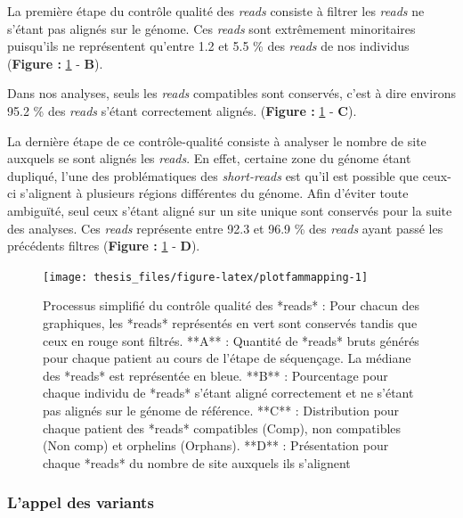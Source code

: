 \documentclass[12pt,twoside]{reedthesis}
\theoremstyle{definition}
\theoremstyle{definition}
\theoremstyle{remark}
\begin{document}
  La première étape du contrôle qualité des \emph{reads} consiste à
  filtrer les \emph{reads} ne s'étant pas alignés sur le génome. Ces
  \emph{reads} sont extrêmement minoritaires puisqu'ils ne représentent
  qu'entre 1.2 et 5.5 \% des \emph{reads} de nos individus (\textbf{Figure
  : }\ref{fig:plotfammapping} - \textbf{B}).
  
  Dans nos analyses, seuls les \emph{reads} compatibles sont conservés,
  c'est à dire environs 95.2 \% des \emph{reads} s'étant correctement
  alignés. (\textbf{Figure : }\ref{fig:plotfammapping} - \textbf{C}).
  
  La dernière étape de ce contrôle-qualité consiste à analyser le nombre
  de site auxquels se sont alignés les \emph{reads}. En effet, certaine
  zone du génome étant dupliqué, l'une des problématiques des
  \emph{short-reads} est qu'il est possible que ceux-ci s'alignent à
  plusieurs régions différentes du génome. Afin d'éviter toute ambiguïté,
  seul ceux s'étant aligné sur un site unique sont conservés pour la suite
  des analyses. Ces \emph{reads} représente entre 92.3 et 96.9 \% des
  \emph{reads} ayant passé les précédents filtres (\textbf{Figure :
  }\ref{fig:plotfammapping} - \textbf{D}).
  
  \newpage 
  
  \begin{figure}
  
  {\centering \texttt{[image: thesis\_files/figure-latex/plotfammapping-1]} 
  
  }
  
  \caption[Processus simplifié du contrôle qualité des *reads*]{Processus simplifié du contrôle qualité des *reads* : Pour chacun des graphiques, les *reads* représentés en vert sont conservés tandis que ceux en rouge sont filtrés. **A** : Quantité de *reads* bruts générés pour chaque patient au cours de l'étape de séquençage. La médiane des *reads* est représentée en bleue. **B** : Pourcentage pour chaque individu de *reads* s'étant aligné correctement et ne s'étant pas alignés sur le génome de référence. **C** : Distribution pour chaque patient des *reads* compatibles (Comp), non compatibles (Non comp) et orphelins (Orphans). **D** : Présentation pour chaque *reads* du nombre de site auxquels ils s'alignent}\label{fig:plotfammapping}
  \end{figure}
  
  \newpage  
  
  \subsubsection{L'appel des variants}\label{lappel-des-variants-1}
  
\end{document}
